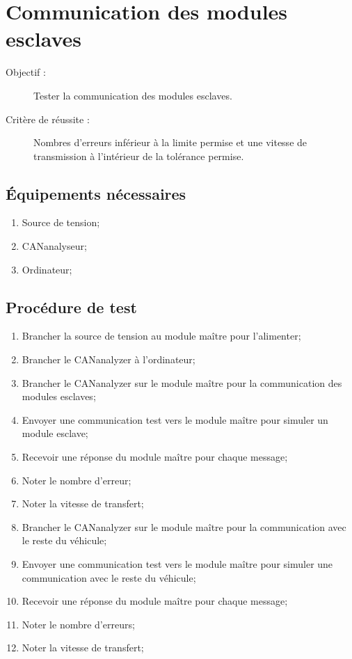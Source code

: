 
\section{Communication des modules esclaves}

\begin{description}
	\item[Objectif :] Tester la communication des modules esclaves.
	\item[Critère de réussite :] Nombres d'erreurs inférieur à la limite permise et une vitesse de transmission à l'intérieur de la tolérance permise.
\end{description}

\subsection*{Équipements nécessaires}
\begin{enumerate}
	\item Source de tension;
	\item CANanalyseur;
	\item Ordinateur;		
\end{enumerate}	

\subsection*{Procédure de test}
\begin{enumerate}
	\item Brancher la source de tension au module maître pour l'alimenter;
	\item Brancher le CANanalyzer à l'ordinateur;
	\item Brancher le CANanalyzer sur le module maître pour la communication des modules esclaves;
	\item Envoyer une communication test vers le module maître pour simuler un module esclave;
	\item Recevoir une réponse du module maître pour chaque message;
	\item Noter le nombre d'erreur; 
	\item Noter la vitesse de transfert;
	\item Brancher le CANanalyzer sur le module maître pour la communication avec le reste du véhicule;
	\item Envoyer une communication test vers le module maître pour simuler une communication avec le reste du véhicule;
	\item Recevoir une réponse du module maître pour chaque message;
	\item Noter le nombre d'erreurs; 
	\item Noter la vitesse de transfert;
	
\end{enumerate}